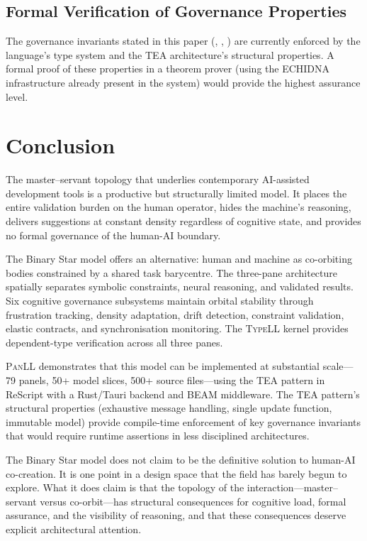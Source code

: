 \documentclass[11pt,a4paper]{article}
\newcommand{\panll}{\textsc{PanLL}}
\newcommand{\typell}{\textsc{TypeLL}}
\newcommand{\tea}{\textsc{TEA}}
\begin{document}
\subsection{Formal Verification of Governance Properties}

The governance invariants stated in this paper (,
, ) are currently
enforced by the language's type system and the \tea{} architecture's
structural properties. A formal proof of these properties in a
theorem prover (using the ECHIDNA infrastructure already present
in the system) would provide the highest assurance level.

\section{Conclusion}\label{sec:conclusion}

The master--servant topology that underlies contemporary AI-assisted
development tools is a productive but structurally limited model.
It places the entire validation burden on the human operator,
hides the machine's reasoning, delivers suggestions at constant
density regardless of cognitive state, and provides no formal
governance of the human-AI boundary.

The Binary Star model offers an alternative: human and machine as
co-orbiting bodies constrained by a shared task barycentre. The
three-pane architecture spatially separates symbolic constraints,
neural reasoning, and validated results. Six cognitive governance
subsystems maintain orbital stability through frustration tracking,
density adaptation, drift detection, constraint validation, elastic
contracts, and synchronisation monitoring. The \typell{} kernel
provides dependent-type verification across all three panes.

\panll{} demonstrates that this model can be implemented at
substantial scale---79 panels, 50+ model slices, 500+ source
files---using the \tea{} pattern in ReScript with a Rust/Tauri
backend and BEAM middleware. The \tea{} pattern's structural
properties (exhaustive message handling, single update function,
immutable model) provide compile-time enforcement of key governance
invariants that would require runtime assertions in less
disciplined architectures.

The Binary Star model does not claim to be the definitive solution
to human-AI co-creation. It is one point in a design space that
the field has barely begun to explore. What it does claim is that
the topology of the interaction---master--servant versus
co-orbit---has structural consequences for cognitive load, formal
assurance, and the visibility of reasoning, and that these
consequences deserve explicit architectural attention.
\end{document}
